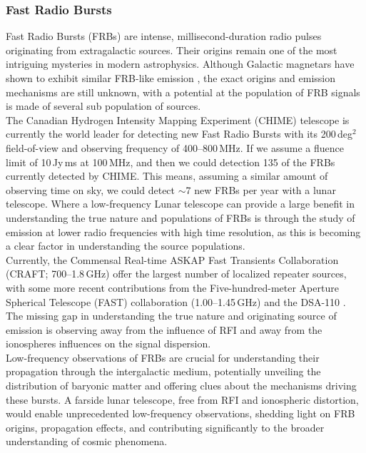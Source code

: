 \subsubsection{Fast Radio Bursts}
Fast Radio Bursts (FRBs) are intense, millisecond-duration radio pulses originating from extragalactic sources. Their origins remain one of the most intriguing mysteries in modern astrophysics. Although Galactic magnetars have shown to exhibit similar FRB-like emission \cite{BC_2020}, the exact origins and emission mechanisms are still unknown, with a potential at the population of FRB signals is made of several sub population of sources.  \\ 

The Canadian Hydrogen Intensity Mapping Experiment (CHIME) telescope is currently the world leader for detecting new Fast Radio Bursts with its 200\,deg$^{2}$ field-of-view and observing frequency of 400--800\,MHz. If we assume a fluence limit of 10\,Jy\,ms at 100\,MHz, and then we could detection 135 of the FRBs currently detected by CHIME. This means, assuming a similar amount of observing time on sky, we could detect $\sim$7 new FRBs per year with a lunar telescope.
Where a low-frequency Lunar telescope can provide a large benefit in understanding the true nature and populations of FRBs is through the study of emission at lower radio frequencies with high time resolution, as this is becoming a clear factor in understanding the source populations. \\ 

Currently, the Commensal Real-time ASKAP Fast Transients Collaboration (CRAFT; 700--1.8\,GHz) offer the largest number of localized repeater sources\citep{SM_2023}, with some more recent contributions from the Five-hundred-meter Aperture Spherical Telescope (FAST) collaboration (1.00--1.45\,GHz\citep{ZX_2023}) and the DSA-110 \citep{SD_2023,LC_2023}. The missing gap in understanding the true nature and originating source of emission is observing away from the influence of RFI and away from the ionospheres influences on the signal dispersion. \\ 

Low-frequency observations of FRBs are crucial for understanding their propagation through the intergalactic medium, potentially unveiling the distribution of baryonic matter and offering clues about the mechanisms driving these bursts. A farside lunar telescope, free from RFI and ionospheric distortion, would enable unprecedented low-frequency observations, shedding light on FRB origins, propagation effects, and contributing significantly to the broader understanding of cosmic phenomena.

